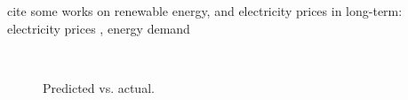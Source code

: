 cite some works on renewable energy, and electricity prices in long-term: electricity prices \cite{hyndman2010density} , energy demand \cite{nowotarski2013robust}

\begin{figure}[!t]
	\centering
	\\
	\caption{Predicted vs. actual.}
	\label{fig:PredictVsActual}
\end{figure}

